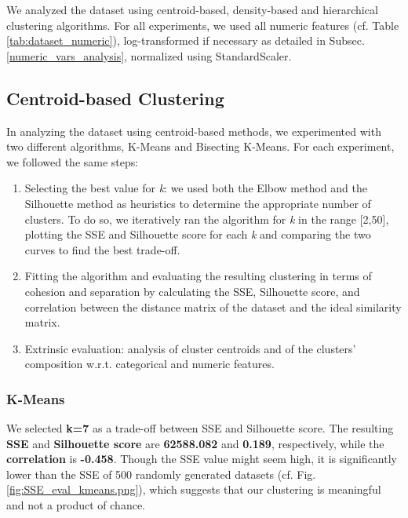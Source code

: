 We analyzed the dataset using centroid-based, density-based and hierarchical clustering algorithms.
For all experiments, we used all numeric features (cf. Table \ref{tab:dataset_numeric}), log-transformed if necessary as detailed in Subsec. \ref{numeric_vars_analysis}, normalized using StandardScaler.

\subsection{Centroid-based Clustering}
\label{centroid_clustering}
In analyzing the dataset using centroid-based methods, we experimented with two different algorithms, K-Means and Bisecting K-Means.
For each experiment, we followed the same steps:
\begin{enumerate}
    \item Selecting the best value for \textit{k}: we used both the Elbow method and the Silhouette method as heuristics to determine the appropriate number of clusters. To do so, we iteratively ran the algorithm for \textit{k} in the range [2,50], plotting the SSE and Silhouette score for each \textit{k} and comparing the two curves to find the best trade-off.
    \item Fitting the algorithm and evaluating the resulting clustering in terms of cohesion and separation by calculating the SSE, Silhouette score, and correlation between the distance matrix of the dataset and the ideal similarity matrix.
    \item Extrinsic evaluation: analysis of cluster centroids and of the clusters' composition w.r.t. categorical and numeric features.
\end{enumerate}

\subsubsection{K-Means}
We selected \textbf{k=7} as a trade-off between SSE and Silhouette score.
The resulting \textbf{SSE} and \textbf{Silhouette score} are \textbf{62588.082} and \textbf{0.189}, respectively, while the \textbf{correlation} is \textbf{-0.458}. Though the SSE value might seem high, it is significantly lower than the SSE of 500 randomly generated datasets (cf. Fig. \ref{fig:SSE_eval_kmeans.png}), which suggests that our clustering is meaningful and not a product of chance.


